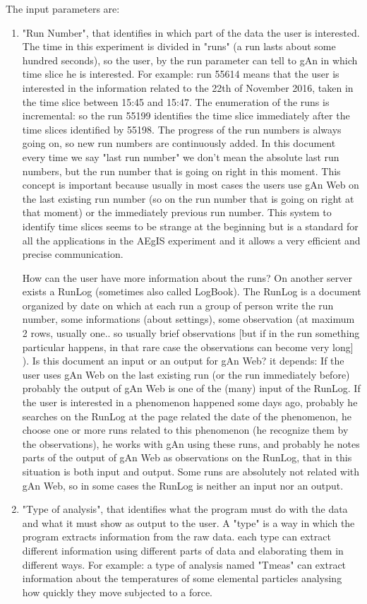The input parameters are:
\begin{enumerate}

\item "Run Number", that identifies in which part of the data the user is interested. 
The time in this experiment is divided in "runs" (a run lasts about some hundred seconds), so the user, by the run parameter can tell to gAn in which time slice he is interested. For example: run 55614 means that the user is interested in the information related to the 22th of November 2016, taken in the time slice between 15:45 and 15:47. 
The enumeration of the runs is incremental: so the run 55199 identifies the time slice immediately after the time slices identified by 55198. The progress of the run numbers is always going on, so new run numbers are continuously added. 
In this document every time we say "last run number" we don't mean the absolute last run numbers, but the run number that is going on right in this moment. This concept is important because usually in most cases the users use gAn Web on the last existing run number (so on the run number that is going on right at that moment) or the immediately previous run number.  
This system to identify time slices seems to be strange at the beginning but is a standard for all the applications in the AEgIS experiment and it allows a very efficient and precise communication.

How can the user have more information about the runs? 
On another server exists a RunLog (sometimes also called LogBook). The RunLog is a document organized by date on which at each run a group of person write the run number, some informations (about settings), some observation (at maximum 2 rows, usually one.. so usually brief observations [but if in the run something particular happens, in that rare case the observations can become very long] ). 
Is this document an input or an output for gAn Web? it depends:
If the user uses gAn Web on the last existing run (or the run immediately before) probably the output of gAn Web is one of the (many) input of the RunLog.  
If the user is interested in a phenomenon happened some days ago, probably he searches on the RunLog at the page related the date of the phenomenon, he choose one or more runs related to this phenomenon (he recognize them by the observations), he works with gAn using these runs, and probably he notes parts of the output of gAn Web as observations on the RunLog, that in this situation is both input and output. Some runs are absolutely not related with gAn Web, so in some cases the RunLog is neither an input nor an output.  

\item "Type of analysis", that identifies what the program must do with the data and what it must show as output to the user.
A "type" is a way in which the program extracts information from the raw data. each type can extract different information using different parts of data and elaborating them in different ways. For example: a type of analysis named "Tmeas" can extract information about the temperatures of some elemental particles analysing how quickly they move subjected to a force. 

\end{enumerate}


